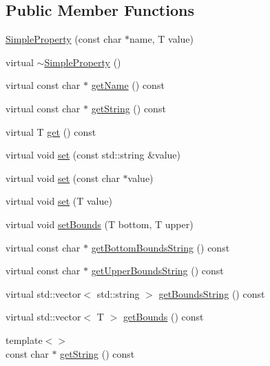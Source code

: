 \subsection*{Public Member Functions}
\begin{DoxyCompactItemize}
\item 
\hyperlink{classmaudio_1_1SimpleProperty_a1a611362de067ce51341233d3cd95746}{Simple\-Property} (const char $\ast$name, T value)
\item 
virtual \hyperlink{classmaudio_1_1SimpleProperty_a8c2ec2d4df05f44cbfb480d56cb639f9}{$\sim$\-Simple\-Property} ()
\item 
virtual const char $\ast$ \hyperlink{classmaudio_1_1SimpleProperty_aafd58fa45a18b7b302d526ff267d9db2}{get\-Name} () const 
\item 
virtual const char $\ast$ \hyperlink{classmaudio_1_1SimpleProperty_a12036db02a41a82e49d21a200b04e8b0}{get\-String} () const 
\item 
virtual T \hyperlink{classmaudio_1_1SimpleProperty_aee3d6b2f5a43bd9bdc135d2b9637e937}{get} () const 
\item 
virtual void \hyperlink{classmaudio_1_1SimpleProperty_a8d887f70f8eb17af2e3a667500cf093f}{set} (const std\-::string \&value)
\item 
virtual void \hyperlink{classmaudio_1_1SimpleProperty_a8edb07f2fd51fd60c43a6f35ef45342b}{set} (const char $\ast$value)
\item 
virtual void \hyperlink{classmaudio_1_1SimpleProperty_af1fc590e317ae98e39495977441eb72e}{set} (T value)
\item 
virtual void \hyperlink{classmaudio_1_1SimpleProperty_a830a17d0512fbed31bf015537d1d73f4}{set\-Bounds} (T bottom, T upper)
\item 
virtual const char $\ast$ \hyperlink{classmaudio_1_1SimpleProperty_a6e0133f2b112033ce7519d2f32d913d4}{get\-Bottom\-Bounds\-String} () const 
\item 
virtual const char $\ast$ \hyperlink{classmaudio_1_1SimpleProperty_ac5ccd635686253991acf57d8a2ddbeca}{get\-Upper\-Bounds\-String} () const 
\item 
virtual std\-::vector$<$ std\-::string $>$ \hyperlink{classmaudio_1_1SimpleProperty_a44cac9f0745c6ee80de51f2763d0a96f}{get\-Bounds\-String} () const 
\item 
virtual std\-::vector$<$ T $>$ \hyperlink{classmaudio_1_1SimpleProperty_af034c612b3a3238468e6a17fc7a64632}{get\-Bounds} () const 
\item 
{\footnotesize template$<$$>$ }\\const char $\ast$ \hyperlink{classmaudio_1_1SimpleProperty_a3033164121186a18c5e4bef19bf939de}{get\-String} () const

\end{DoxyCompactItemize}
